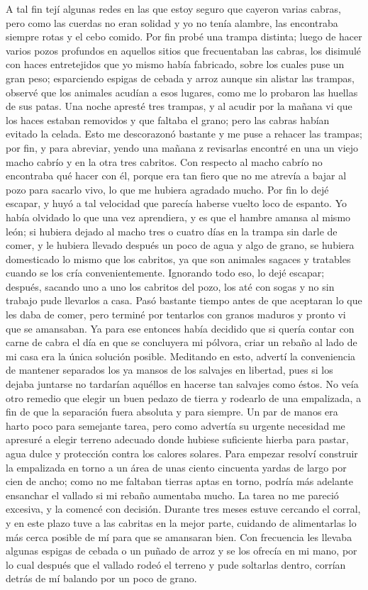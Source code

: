 \documentclass{novela}
\begin{document}
    A tal fin tejí algunas redes en las que estoy seguro que cayeron varias cabras, pero como las cuerdas no eran solidad y yo no tenía alambre, las encontraba siempre rotas y el cebo comido. Por fin probé una trampa distinta; luego de hacer varios pozos profundos en aquellos sitios que frecuentaban las cabras, los disimulé con haces entretejidos que yo mismo había fabricado, sobre los cuales puse un gran peso; esparciendo espigas de cebada y arroz aunque sin alistar las trampas, observé que los animales acudían a esos lugares, como me lo probaron las huellas de sus patas. Una noche apresté tres trampas, y al acudir por la mañana vi que los haces estaban removidos y que faltaba el grano; pero las cabras habían evitado la celada. Esto me descorazonó bastante y me puse a rehacer las trampas; por fin, y para abreviar, yendo una mañana z revisarlas encontré en una un viejo macho cabrío y en la otra tres cabritos.
    Con respecto al macho cabrío no encontraba qué hacer con él, porque era tan fiero que no me atrevía a bajar al pozo para sacarlo vivo, lo que me hubiera agradado mucho. Por fin lo dejé escapar, y huyó a tal velocidad que parecía haberse vuelto loco de espanto. Yo había olvidado lo que una vez aprendiera, y es que el hambre amansa al mismo león; si hubiera dejado al macho tres o cuatro días en la trampa sin darle de comer, y le hubiera llevado después un poco de agua y algo de grano, se hubiera domesticado lo mismo que los cabritos, ya que son animales sagaces y tratables cuando se los cría convenientemente.
    Ignorando todo eso, lo dejé escapar; después, sacando uno a uno los cabritos del pozo, los até con sogas y no sin trabajo pude llevarlos a casa.
    Pasó bastante tiempo antes de que aceptaran lo que les daba de comer, pero terminé por tentarlos con granos maduros y pronto vi que se amansaban. Ya para ese entonces había decidido que si quería contar con carne de cabra el día en que se concluyera mi pólvora, criar un rebaño al lado de mi casa era la única solución posible.
    Meditando en esto, advertí la conveniencia de mantener separados los ya mansos de los salvajes en libertad, pues si los dejaba juntarse no tardarían aquéllos en hacerse tan salvajes como éstos. No veía otro remedio que elegir un buen pedazo de tierra y rodearlo de una empalizada, a fin de que la separación fuera absoluta y para siempre.
    Un par de manos era harto poco para semejante tarea, pero como advertía su urgente necesidad me apresuré a elegir terreno adecuado donde hubiese suficiente hierba para pastar, agua dulce y protección contra los calores solares.
    Para empezar resolví construir la empalizada en torno a un área de unas ciento cincuenta yardas de largo por cien de ancho; como no me faltaban tierras aptas en torno, podría más adelante ensanchar el vallado si mi rebaño aumentaba mucho. La tarea no me pareció excesiva, y la comencé con decisión. Durante tres meses estuve cercando el corral, y en este plazo tuve a las cabritas en la mejor parte, cuidando de alimentarlas lo más cerca posible de mí para que se amansaran bien. Con frecuencia les llevaba algunas espigas de cebada o un puñado de arroz y se los ofrecía en mi mano, por lo cual después que el vallado rodeó el terreno y pude soltarlas dentro, corrían detrás de mí balando por un poco de grano.
\end{document}
